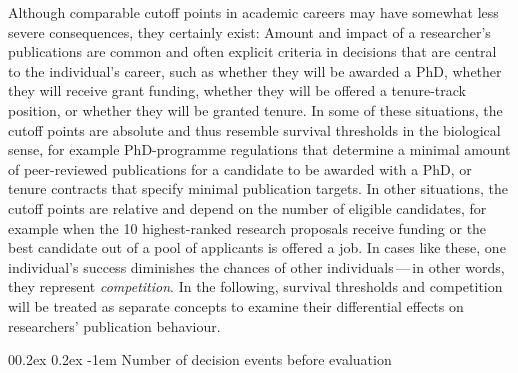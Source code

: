 \documentclass[british,,man,floatsintext]{apa6}
\makeatletter
\renewcommand{\paragraph}{\@startsection{paragraph}{4}{\parindent}%
  {0\baselineskip \@plus 0.2ex \@minus 0.2ex}%
  {-1em}%
  {\normalfont\normalsize\bfseries\itshape\typesectitle}}
\makeatother
\begin{document}
Although comparable cutoff points in academic careers may have somewhat less severe consequences, they certainly exist:
Amount and impact of a researcher's publications are common and often explicit criteria in decisions that are central to the individual's career, such as whether they will be awarded a PhD, whether they will receive grant funding, whether they will be offered a tenure-track position, or whether they will be granted tenure.
In some of these situations, the cutoff points are absolute and thus resemble survival thresholds in the biological sense, for example PhD-programme regulations that determine a minimal amount of peer-reviewed publications for a candidate to be awarded with a PhD, or tenure contracts that specify minimal publication targets.
In other situations, the cutoff points are relative and depend on the number of eligible candidates, for example when the 10 highest-ranked research proposals receive funding or the best candidate out of a pool of applicants is offered a job.
In cases like these, one individual's success diminishes the chances of other individuals\(\,\)---\(\,\)in other words, they represent \emph{competition}.
In the following, survival thresholds and competition will be treated as separate concepts to examine their differential effects on researchers' publication behaviour.

\hypertarget{number-of-decision-events-before-evaluation}{%
\paragraph{Number of decision events before evaluation}\label{number-of-decision-events-before-evaluation}}
\end{document}
